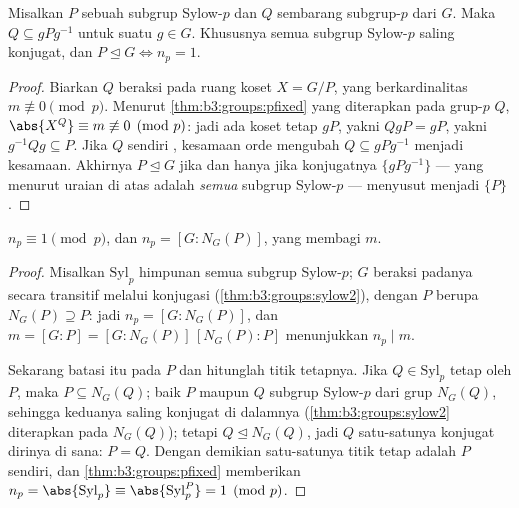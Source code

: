 \begin{theorem}\label{thm:b3:groups:sylow2}
Misalkan $P$ sebuah subgrup Sylow-$p$ dan $Q$ sembarang subgrup-$p$ dari $G$.
Maka $Q \subseteq gPg^{-1}$ untuk suatu $g \in G$. Khususnya semua
subgrup Sylow-$p$ saling konjugat, dan $P \trianglelefteq G \iff
n_p = 1$.
\end{theorem}

\begin{proof}
Biarkan $Q$ beraksi pada ruang koset $X = G/P$, yang berkardinalitas $m
\not\equiv 0 \pmod p$. Menurut \cref{thm:b3:groups:pfixed} yang diterapkan pada
grup-$p$ $Q$, $\abs{X^Q} \equiv m \not\equiv 0 \pmod p$: jadi ada
koset tetap $gP$, yakni $QgP = gP$, yakni $g^{-1}Qg \subseteq
P$. Jika $Q$ sendiri , kesamaan orde mengubah
$Q \subseteq gPg^{-1}$ menjadi kesamaan. Akhirnya $P
\trianglelefteq G$ jika dan hanya jika konjugatnya $\{gPg^{-1}\}$ --- yang menurut
uraian di atas adalah \emph{semua} subgrup Sylow-$p$ --- menyusut menjadi
$\{P\}$.
\end{proof}

\begin{theorem}\label{thm:b3:groups:sylow3}
$n_p \equiv 1 \pmod p$, dan $n_p = [G : N_G(P)]$, yang membagi
$m$.
\end{theorem}

\begin{proof}
Misalkan $\mathrm{Syl}_p$ himpunan semua subgrup Sylow-$p$; $G$ beraksi
padanya secara transitif melalui konjugasi (\cref{thm:b3:groups:sylow2}), dengan
 $P$ berupa  $N_G(P) \supseteq P$: jadi $n_p = [G :
N_G(P)]$, dan $m = [G:P] = [G:N_G(P)]\,[N_G(P):P]$ menunjukkan $n_p \mid
m$.

Sekarang batasi  itu pada $P$ dan hitunglah titik tetapnya. Jika $Q \in
\mathrm{Syl}_p$ tetap oleh $P$, maka $P \subseteq N_G(Q)$; baik
$P$ maupun $Q$ subgrup Sylow-$p$ dari grup $N_G(Q)$, sehingga keduanya
saling konjugat di dalamnya (\cref{thm:b3:groups:sylow2} diterapkan pada $N_G(Q)$);
tetapi $Q \trianglelefteq N_G(Q)$, jadi $Q$ satu-satunya konjugat dirinya di sana:
$P = Q$. Dengan demikian satu-satunya titik tetap adalah $P$ sendiri, dan
\cref{thm:b3:groups:pfixed} memberikan $n_p = \abs{\mathrm{Syl}_p}
\equiv \abs{\mathrm{Syl}_p^P} = 1 \pmod p$.
\end{proof}


